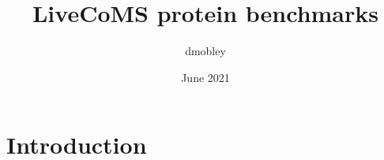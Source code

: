 \documentclass{article}
\title{LiveCoMS protein benchmarks}
\author{dmobley }
\date{June 2021}
\begin{document}
\maketitle

\section{Introduction}
\end{document}
